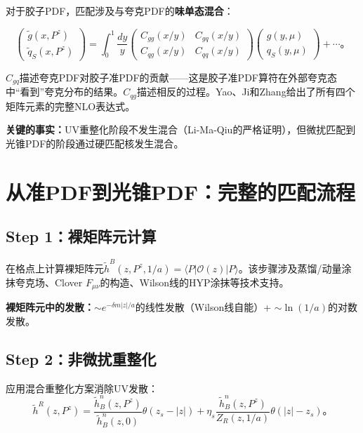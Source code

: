 \documentclass[12pt,a4paper]{ctexart}
\theoremstyle{definition}
\begin{document}
对于胶子PDF，匹配涉及与夸克PDF的\textbf{味单态混合}\cite{Zhang2019,Yao2023}：

\begin{equation}
\begin{pmatrix} \tilde{g}(x, P^z) \\ \tilde{q}_S(x, P^z) \end{pmatrix} = \int_0^1 \frac{dy}{y}
\begin{pmatrix} C_{gg}(x/y) & C_{gq}(x/y) \\ C_{qg}(x/y) & C_{qq}(x/y) \end{pmatrix}
\begin{pmatrix} g(y, \mu) \\ q_S(y, \mu) \end{pmatrix} + \cdots。
\label{eq:mixing_matrix}
\end{equation}

$C_{gq}$描述夸克PDF对胶子准PDF的贡献——这是胶子准PDF算符在外部夸克态中``看到''夸克分布的结果。$C_{qg}$描述相反的过程。Yao、Ji和Zhang\cite{Yao2023}给出了所有四个矩阵元素的完整NLO表达式。

\textbf{关键的事实：}UV重整化阶段不发生混合（Li-Ma-Qiu\cite{Li2018multiplicative}的严格证明），但微扰匹配到光锥PDF的阶段通过硬匹配核发生混合\cite{Zhang2019}。

\section{从准PDF到光锥PDF：完整的匹配流程}

\subsection{Step 1：裸矩阵元计算}

在格点上计算裸矩阵元$\tilde{h}^B(z, P^z, 1/a) = \langle P|\mathcal{O}(z)|P\rangle$。该步骤涉及蒸馏/动量涂抹夸克场、Clover $F_{\mu\nu}$的构造、Wilson线的HYP涂抹等技术支持\cite{Chen2025gluon,Peardon2009}。

\textbf{裸矩阵元中的发散：}$\sim e^{-\delta m|z|/a}$的线性发散（Wilson线自能）+ $\sim \ln(1/a)$的对数发散。

\subsection{Step 2：非微扰重整化}

应用混合重整化方案\cite{Ji2021hybrid}消除UV发散：
\begin{equation}
\tilde{h}^R(z, P^z) = \frac{\tilde{h}^n_B(z, P^z)}{\tilde{h}^n_B(z, 0)} \theta(z_s - |z|) + \eta_s \frac{\tilde{h}^n_B(z, P^z)}{Z_R(z, 1/a)} \theta(|z| - z_s)。
\end{equation}
\end{document}
